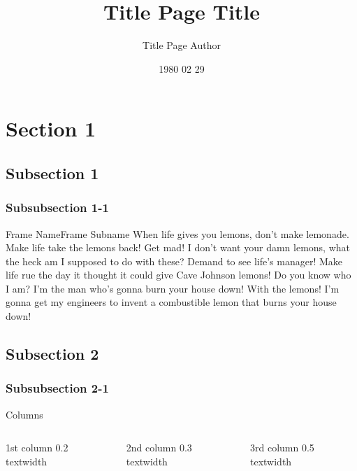 \documentclass[a4paper,11pt]{beamer}
\title[Short Title]{Title Page Title}
\author[Short Author]{Title Page Author}
\date{1980 02 29}
\begin{document}
	\begingroup
	\makeatletter
	\setlength{\hoffset}{-.5\beamer@sidebarwidth}
	\makeatother
	\begin{frame}[plain]
		\titlepage
	\end{frame}
	\endgroup
	
\section{Section 1}
\subsection{Subsection 1}
\subsubsection{Subsubsection 1-1}

	\begin{frame}{Frame Name}{Frame Subname}
		When life gives you lemons, don't make lemonade. Make life take the lemons back! Get mad! I don't want your damn lemons, what the heck am I supposed to do with these? Demand to see life's manager! Make life rue the day it thought it could give Cave Johnson lemons! Do you know who I am? I'm the man who's gonna burn your house down! With the lemons! I'm gonna get my engineers to invent a combustible lemon that burns your house down!
	\end{frame}

\subsection{Subsection 2}
\subsubsection{Subsubsection 2-1}

	\begin{frame}{Columns}
		\begin{columns}
			\begin{column}{.2\textwidth}
				1st column 0.2 textwidth
			\end{column}
			\begin{column}{.3\textwidth}
				2nd column 0.3 textwidth
			\end{column}
			\begin{column}{.5\textwidth}
				3rd column 0.5 textwidth
			\end{column}
		\end{columns}
	\end{frame}
\end{document}

